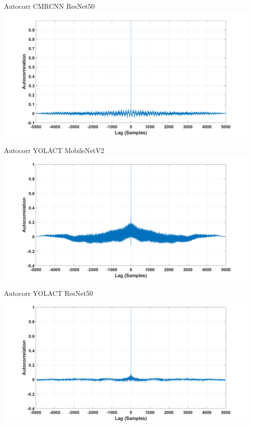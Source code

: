 \documentclass[18pt]{beamer}
\begin{document}
\begin{frame}{Autocorr CMRCNN ResNet50}
\includegraphics[width=\textwidth]{figures/graphs/autocorr_cmrcnn_resnet50.png}
\end{frame}

\begin{frame}{Autocorr YOLACT MobileNetV2}
\includegraphics[width=\textwidth]{figures/graphs/autocorr_yolact_mobilenetv2.png}
\end{frame}

\begin{frame}{Autocorr YOLACT ResNet50}
\includegraphics[width=\textwidth]{figures/graphs/autocorr_yolact_resnet50.png}
\end{frame}
\end{document}
